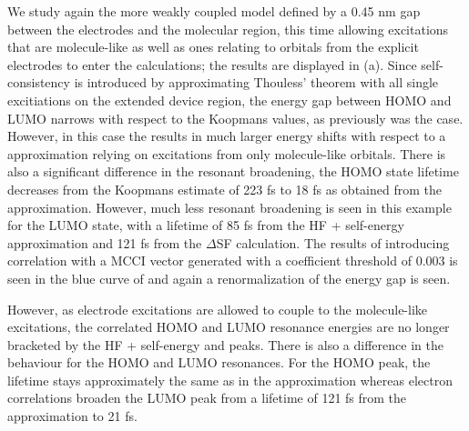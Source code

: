 We study again the more weakly coupled model defined by a 0.45 nm gap
between the electrodes and the molecular region, this time allowing
excitations that are molecule-like as well as ones relating to orbitals
from the explicit electrodes to enter the calculations;
the results are displayed in (a). 
Since self-consistency is introduced by approximating Thouless' theorem
with all single excitiations on the extended device region, the energy gap
between HOMO and LUMO narrows with respect to the Koopmans values, as
previously was the case. However, in this case the \dscf results
in much larger energy shifts with respect to a \dscf approximation
relying on excitations from only molecule-like orbitals. There is also a
significant difference in the resonant broadening, the HOMO state lifetime
decreases from the Koopmans estimate of 223 fs to 18 fs as obtained from
the \dscf approximation. 
However, much less resonant broadening is seen in this example for the
LUMO state, with a lifetime of 85 fs from the HF + self-energy approximation
and 121 fs from the $\Delta$SF calculation. The results of introducing
correlation with a MCCI vector generated with a coefficient threshold of
0.003 is seen in the blue curve of  and again a
renormalization of the energy gap is seen.

However, as electrode excitations are allowed to couple to the
molecule-like excitations, the correlated HOMO and LUMO resonance energies
are no longer bracketed by the HF + self-energy and \dscf peaks.
There is also a difference in the behaviour for the HOMO and LUMO resonances.
For the HOMO peak, the lifetime stays approximately the same as in the
\dscf approximation whereas electron correlations broaden the LUMO
peak from a lifetime of 121 fs from the \dscf approximation to 21
fs. 

